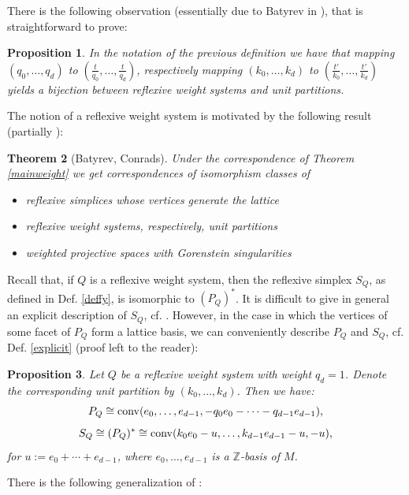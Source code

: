 \documentclass[a4paper,twoside]{article}
\def\Z{{\mathbb Z}}
\def\conv{{\rm conv}}
\newtheorem{theorem}{Theorem}[section]
\newtheorem{proposition}[theorem]{Proposition}
\begin{document}
There is the following observation (essentially due to Batyrev in \cite[5.4]{Bat94}), that is straightforward to prove:

\begin{proposition}
In the notation of the previous definition we have that 
mapping $(q_0, \ldots, q_d)$ to $(\frac{t}{q_0}, \ldots, \frac{t}{q_d})$, respectively 
mapping $(k_0, \ldots, k_d)$ to $(\frac{t'}{k_0}, \ldots, \frac{t'}{k_d})$ yields a bijection between 
reflexive weight systems and unit partitions.
\end{proposition}

The notion of a reflexive weight system is motivated by the following result \cite[Prop. 5.1]{Con02} 
(partially \cite[Thm. 5.4.3]{Bat94}):

\begin{theorem}[Batyrev, Conrads]
Under the correspondence of Theorem \ref{mainweight} we get correspondences of isomorphism classes of
\begin{itemize}
\item reflexive simplices whose vertices generate the lattice
\item reflexive weight systems, respectively, unit partitions
\item weighted projective spaces with Gorenstein singularities
\end{itemize}
\label{reftheo}
\end{theorem}

Recall that, if $Q$ is a reflexive weight system, then the reflexive simplex $S_Q$, as defined in Def. \ref{deffy}, is isomorphic to $(P_Q)^*$. 
It is difficult to give in general an explicit description of $S_Q$, cf. \cite{Con02}. 
However, in the case in which the vertices of some facet of $P_Q$ form a lattice basis, we can conveniently describe 
$P_Q$ and $S_Q$, cf. Def. \ref{explicit} (proof left to the reader):

\begin{proposition}
Let $Q$ be a reflexive weight system with weight $q_d = 1$. Denote the corresponding unit partition 
by $(k_0, \ldots, k_d)$. Then we have:
\[P_Q \cong \conv(e_0, \ldots, e_{d-1}, -q_0 e_0 - \cdots - q_{d-1} e_{d-1}),\]
\[S_Q \cong (P_Q)^* \cong \conv(k_0 e_0 - u, \ldots, k_{d-1} e_{d-1} - u, -u),\]
for $u := e_0 + \cdots + e_{d-1}$, where $e_0, \ldots, e_{d-1}$ is a $\Z$-basis 
of $M$.
\label{constr}
\end{proposition}

There is the following generalization of \cite[5.3, 5.5]{Con02}:
\end{document}
